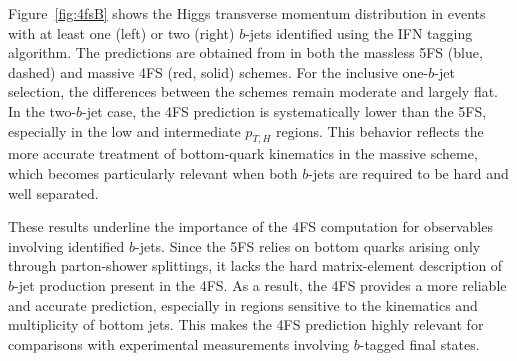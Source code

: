 \documentclass[11pt,a4paper]{article}
\begin{document}

Figure~\ref{fig:4fsB} shows the Higgs transverse momentum distribution in events with at least one (left) or two (right) $b$-jets identified using the IFN tagging algorithm. The predictions are obtained from \minnlo{} in both the massless 5FS (blue, dashed) and massive 4FS (red, solid) schemes. For the inclusive one-$b$-jet selection, the differences between the schemes remain moderate and largely flat. In the two-$b$-jet case, the 4FS prediction is systematically lower than the 5FS, especially in the low and intermediate $p_{T,H}$ regions. This behavior reflects the more accurate treatment of bottom-quark kinematics in the massive scheme, which becomes particularly relevant when both $b$-jets are required to be hard and well separated.

These results underline the importance of the 4FS computation for observables involving identified $b$-jets. Since the 5FS relies on bottom quarks arising only through parton-shower splittings, it lacks the hard matrix-element description of $b$-jet production present in the 4FS. As a result, the 4FS provides a more reliable and accurate prediction, especially in regions sensitive to the kinematics and multiplicity of bottom jets. This makes the 4FS prediction highly relevant for comparisons with experimental measurements involving $b$-tagged final states.
\end{document}
